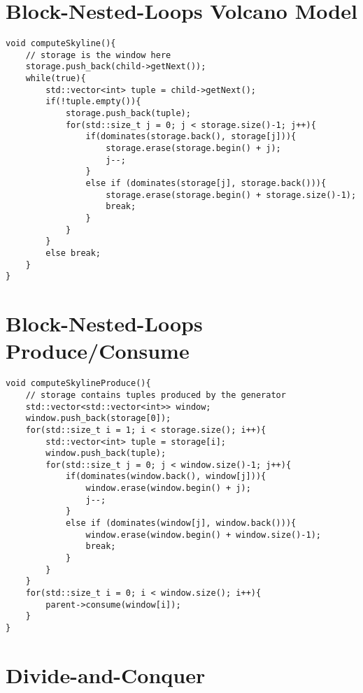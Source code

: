 \section{Block-Nested-Loops Volcano Model}
\begin{verbatim}
void computeSkyline(){
	// storage is the window here
	storage.push_back(child->getNext());
	while(true){
		std::vector<int> tuple = child->getNext();
		if(!tuple.empty()){
			storage.push_back(tuple);
			for(std::size_t j = 0; j < storage.size()-1; j++){
				if(dominates(storage.back(), storage[j])){
					storage.erase(storage.begin() + j);
					j--;
				}
				else if (dominates(storage[j], storage.back())){
					storage.erase(storage.begin() + storage.size()-1);
					break;
				}
			}
		}
		else break;
	}
}
\end{verbatim}

\section{Block-Nested-Loops Produce/Consume}
\begin{verbatim}
void computeSkylineProduce(){
	// storage contains tuples produced by the generator
	std::vector<std::vector<int>> window;
	window.push_back(storage[0]);
	for(std::size_t i = 1; i < storage.size(); i++){
		std::vector<int> tuple = storage[i];
		window.push_back(tuple);
		for(std::size_t j = 0; j < window.size()-1; j++){
			if(dominates(window.back(), window[j])){
				window.erase(window.begin() + j);
				j--;
			}
			else if (dominates(window[j], window.back())){
				window.erase(window.begin() + window.size()-1);
				break;
			}
		}
	}
	for(std::size_t i = 0; i < window.size(); i++){
		parent->consume(window[i]);
	}
}
\end{verbatim}

\section{Divide-and-Conquer}

